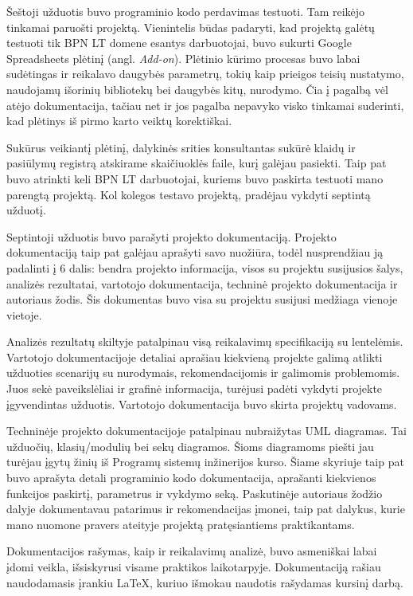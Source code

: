\documentclass{VUMIFPSkursinis}
\begin{document}
Šeštoji užduotis buvo programinio kodo perdavimas testuoti. Tam reikėjo tinkamai paruošti projektą. Vienintelis būdas padaryti, kad projektą galėtų testuoti tik BPN LT domene esantys darbuotojai, buvo sukurti Google Spreadsheets plėtinį (angl. \textit{Add-on}). Plėtinio kūrimo procesas buvo labai sudėtingas ir reikalavo daugybės parametrų, tokių kaip prieigos teisių nustatymo, naudojamų išorinių bibliotekų bei daugybės kitų, nurodymo. Čia į pagalbą vėl atėjo dokumentacija, tačiau net ir jos pagalba nepavyko visko tinkamai suderinti, kad plėtinys iš pirmo karto veiktų korektiškai.

Sukūrus veikiantį plėtinį, dalykinės srities konsultantas sukūrė klaidų ir pasiūlymų registrą atskirame skaičiuoklės faile, kurį galėjau pasiekti. Taip pat buvo atrinkti keli BPN LT darbuotojai, kuriems buvo paskirta testuoti mano parengtą projektą. Kol kolegos testavo projektą, pradėjau vykdyti septintą užduotį.

Septintoji užduotis buvo parašyti projekto dokumentaciją. Projekto dokumentaciją taip pat galėjau aprašyti savo nuožiūra, todėl nusprendžiau ją padalinti į 6 dalis: bendra projekto informacija, visos su projektu susijusios šalys, analizės rezultatai, vartotojo dokumentacija, techninė projekto dokumentacija ir autoriaus žodis. Šis dokumentas buvo visa su projektu susijusi medžiaga vienoje vietoje.

Analizės rezultatų skiltyje patalpinau visą reikalavimų specifikaciją su lentelėmis. Vartotojo dokumentacijoje detaliai aprašiau kiekvieną projekte galimą atlikti užduoties scenarijų su nurodymais, rekomendacijomis ir galimomis problemomis. Juos sekė paveikslėliai ir grafinė informacija, turėjusi padėti vykdyti projekte įgyvendintas užduotis. Vartotojo dokumentacija buvo skirta projektų vadovams. 

Techninėje projekto dokumentacijoje patalpinau nubraižytas UML diagramas. Tai užduočių, klasių/modulių bei sekų diagramos. Šioms diagramoms piešti jau turėjau įgytų žinių iš Programų sistemų inžinerijos kurso. Šiame skyriuje taip pat buvo aprašyta detali programinio kodo dokumentacija, aprašanti kiekvienos funkcijos paskirtį, parametrus ir vykdymo seką. Paskutinėje autoriaus žodžio dalyje dokumentavau patarimus ir rekomendacijas įmonei, taip pat dalykus, kurie mano nuomone pravers ateityje projektą pratęsiantiems praktikantams. 

Dokumentacijos rašymas, kaip ir reikalavimų analizė, buvo asmeniškai labai įdomi veikla, išsiskyrusi visame praktikos laikotarpyje. Dokumentaciją rašiau naudodamasis įrankiu \LaTeX, kuriuo išmokau naudotis rašydamas kursinį darbą.
\end{document}

